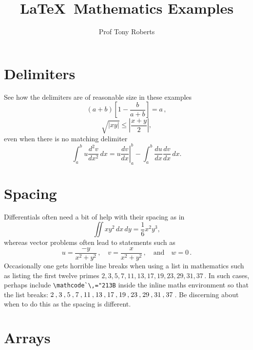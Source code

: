\documentclass[20pt,a4paper]{extarticle}
\title{\LaTeX\ Mathematics Examples}
\author{Prof Tony Roberts}
\begin{document}
\maketitle

\tableofcontents



\section{Delimiters}

See how the delimiters are of reasonable size in these examples
\[
	\left(a+b\right)\left[1-\frac{b}{a+b}\right]=a\,,
\]
\[
	\sqrt{|xy|}\leq\left|\frac{x+y}{2}\right|,
\]
even when there is no matching delimiter
\[
	\int_a^bu\frac{d^2v}{dx^2}\,dx
	=\left.u\frac{dv}{dx}\right|_a^b
	-\int_a^b\frac{du}{dx}\frac{dv}{dx}\,dx.
\]






\section{Spacing}

Differentials often need a bit of help with their spacing as in
\[
	\iint xy^2\,dx\,dy 
	=\frac{1}{6}x^2y^3,
\]
whereas vector problems often lead to statements such as
\[
	u=\frac{-y}{x^2+y^2}\,,\quad
	v=\frac{x}{x^2+y^2}\,,\quad\text{and}\quad
	w=0\,.
\]
Occasionally one gets horrible line breaks when using a list in mathematics such as listing the first twelve primes  \(2,3,5,7,11,13,17,19,23,29,31,37\)\,.
In such cases, perhaps include \verb|\mathcode`\,="213B| inside the inline maths environment so that the list breaks: \(\mathcode`\,="213B 2,3,5,7,11,13,17,19,23,29,31,37\)\,.
Be discerning about when to do this as the spacing is different.






\section{Arrays}
\end{document}
